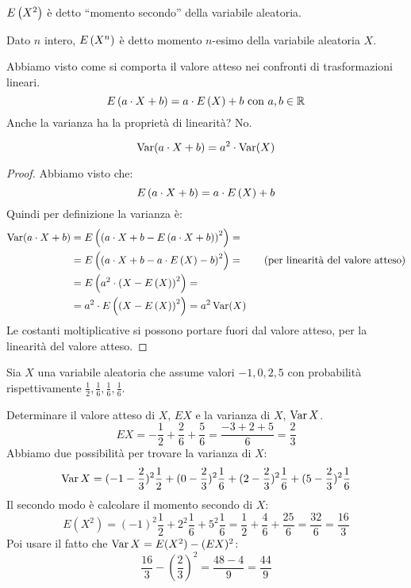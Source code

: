$E \left( X^2 \right)$ \`e detto ``momento secondo'' della variabile aleatoria.

\begin{defn}
Dato $n$ intero, $E \left( X^n \right)$ \`e detto momento $n$-esimo della variabile aleatoria $X$.
\end{defn}

Abbiamo visto come si comporta il valore atteso nei confronti di trasformazioni lineari.
\[
E \left( a \cdot X + b \right) = a \cdot E \left( X \right) + b \text{ con } a,b \in \mathbb{R}
\]
Anche la varianza ha la propriet\`a di linearit\`a? No.
\begin{prop}
\[
\operatorname{Var} (a \cdot X + b) = a^2 \cdot \operatorname{Var} (X)
\]
\end{prop}
\begin{proof}
Abbiamo visto che: 
\[
E \left( a \cdot X + b \right) = a \cdot E \left( X \right) + b
\]
Quindi per definizione la varianza \`e:
\begin{align*}
\operatorname{Var} (a \cdot X + b) &= E \left(  {\left( a \cdot X + b - E \left( a \cdot X + b \right) \right)}^2 \right) = \\
&= E \left( {\left( a \cdot X + b - a \cdot E \left( X \right) - b \right)}^2 \right) = \tag{per linearit\`a del valore atteso} \\
&= E \left( a^2 \cdot {\left( X - E \left( X \right) \right)}^2 \right) = \\
&= a^2 \cdot E \left( {\left( X - E \left( X \right) \right)}^2 \right) = a^2 \operatorname{Var} (X)
\end{align*}
Le costanti moltiplicative si possono portare fuori dal valore atteso, per la linearit\`a del valore atteso.
\end{proof}

\begin{exmp}
Sia $X$ una variabile aleatoria che assume valori $-1, 0, 2, 5$ con probabilit\`a rispettivamente $\frac{1}{2}, \frac{1}{6}, \frac{1}{6}, \frac{1}{6}$.

Determinare il valore atteso di $X$, $EX$ e la varianza di $X$, $\operatorname{Var} X$.
\[
EX = -\frac{1}{2} + \frac{2}{6} + \frac{5}{6} = \frac{-3 + 2 + 5}{6} = \frac{2}{3}
\]
Abbiamo due possibilit\`a per trovare la varianza di $X$:
\[
\operatorname{Var} X = (-1 - \frac{2}{3})^2 \frac{1}{2} + (0 - \frac{2}{3})^2 \frac{1}{6} + (2 - \frac{2}{3})^2 \frac{1}{6} + (5 - \frac{2}{3})^2 \frac{1}{6}
\]
Il secondo modo \`e calcolare il momento secondo di $X$:
\[
E(X^2) = (-1)^2 \frac{1}{2} + 2^2 \frac{1}{6} + 5^2 \frac{1}{6} = 
\frac{1}{2} + \frac{4}{6} + \frac{25}{6} = \frac{32}{6} = \frac{16}{3}
\]
Poi usare il fatto che $\operatorname{Var} X = E(X^2) - (EX)^2$:
\[
\frac{16}{3} - \left( \frac{2}{3} \right)^2 = \frac{48 - 4}{9} = \frac{44}{9}
\]
\end{exmp}

